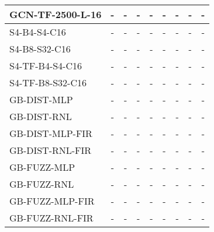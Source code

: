 \begin{table*}[h]
\begin{tabular}{lcccccccc}
        GCN-TF-2500-L-16               
            & - & - & - & - & - & - & - & - \\
        \midrule
        S4-B4-S4-C16              
            & - & - & - & - & - & - & - & - \\
        S4-B8-S32-C16               
            & - & - & - & - & - & - & - & - \\
        \midrule
        S4-TF-B4-S4-C16              
            & - & - & - & - & - & - & - & - \\
        S4-TF-B8-S32-C16               
            & - & - & - & - & - & - & - & - \\
        \midrule
        GB-DIST-MLP             
            & - & - & - & - & - & - & - & - \\
        GB-DIST-RNL             
            & - & - & - & - & - & - & - & - \\
        \midrule
        GB-DIST-MLP-FIR
            & - & - & - & - & - & - & - & - \\
        GB-DIST-RNL-FIR         
            & - & - & - & - & - & - & - & - \\
        \midrule
        GB-FUZZ-MLP             
            & - & - & - & - & - & - & - & - \\
        GB-FUZZ-RNL             
            & - & - & - & - & - & - & - & - \\
        \midrule
        GB-FUZZ-MLP-FIR
            & - & - & - & - & - & - & - & - \\
        GB-FUZZ-RNL-FIR         
            & - & - & - & - & - & - & - & - \\
        \bottomrule 
    \end{tabular}
    \label{tab:other_fx}
\end{table*}